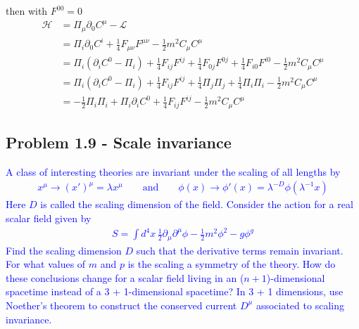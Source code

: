 \documentclass[../main.tex]{subfiles}
\begin{document}
then with $F^{00}=0$
\begin{align}
\mathcal{H}
&=\Pi_\mu\partial_0C^\mu-\mathcal{L}\\
&=\Pi_i\partial_0C^i+\frac{1}{4}F_{\mu\nu}F^{\mu\nu}-\frac{1}{2}m^2C_\mu C^\mu\\
&=\Pi_i(\partial_iC^0-\Pi_i)+\frac{1}{4}F_{ij}F^{ij}+\frac{1}{4}F_{0j}F^{0j}+\frac{1}{4}F_{i0}F^{i0}-\frac{1}{2}m^2C_\mu C^\mu\\
&=\Pi_i(\partial_iC^0-\Pi_i)+\frac{1}{4}F_{ij}F^{ij}+\frac{1}{4}\Pi_j\Pi_j+\frac{1}{4}\Pi_i\Pi_i-\frac{1}{2}m^2C_\mu C^\mu\\
&=-\frac{1}{2}\Pi_i\Pi_i+\Pi_i\partial_iC^0+\frac{1}{4}F_{ij}F^{ij}-\frac{1}{2}m^2C_\mu C^\mu
\end{align}

\subsection{Problem 1.9 - Scale invariance}

\textcolor{blue}{
A class of interesting theories are invariant under the scaling of all lengths by
\begin{align}
x^\mu \rightarrow (x')^\mu=\lambda x^\mu \qquad\text{and}\qquad \phi(x)\rightarrow \phi'(x) = \lambda^{-D}\phi(\lambda^{-1}x)
\end{align}
Here $D$ is called the scaling dimension of the field. Consider the action for a real scalar field given by
\begin{align}
S=\int d^4x\,\frac{1}{2}\partial_\mu\partial^\mu\phi-\frac{1}{2}
m^2\phi^2-g\phi^g
\end{align}
Find the scaling dimension $D$ such that the derivative terms remain invariant. For what values of $m$ and $p$ is the scaling a symmetry of the theory. How do these conclusions change for a scalar field living in an ($n+1$)-dimensional spacetime instead of a 3 + 1-dimensional spacetime?\newline
In 3 + 1 dimensions, use Noether’s theorem to construct the conserved current $D^\mu$ associated to scaling invariance.
}
\end{document}
